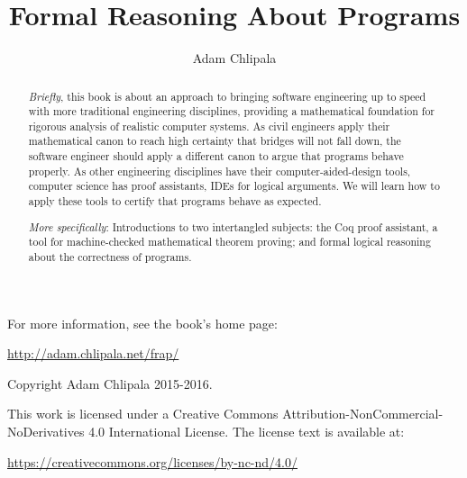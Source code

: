 \documentclass{amsbook}
\theoremstyle{definition}
\theoremstyle{remark}
\numberwithin{section}{chapter}
\numberwithin{equation}{chapter}
\begin{document}
\frontmatter

\title{Formal Reasoning About Programs}

\author{Adam Chlipala}
\address{MIT, Cambridge, MA, USA}

\begin{abstract}
  \emph{Briefly}, this book is about an approach to bringing software engineering up to speed with more traditional engineering disciplines, providing a mathematical foundation for rigorous analysis of realistic computer systems. As civil engineers apply their mathematical canon to reach high certainty that bridges will not fall down, the software engineer should apply a different canon to argue that programs behave properly. As other engineering disciplines have their computer-aided-design tools, computer science has proof assistants, IDEs for logical arguments. We will learn how to apply these tools to certify that programs behave as expected.

  \emph{More specifically}: Introductions to two intertangled subjects: the Coq proof assistant, a tool for machine-checked mathematical theorem proving; and formal logical reasoning about the correctness of programs.
\end{abstract}

\maketitle

\newpage

For more information, see the book's home page:

\begin{center} \url{http://adam.chlipala.net/frap/} \end{center}

\thispagestyle{empty}
\mbox{}\vfill
\begin{center}

Copyright Adam Chlipala 2015-2016.


This work is licensed under a
Creative Commons Attribution-NonCommercial-NoDerivatives 4.0 International License.
The license text is available at:

\end{center}

\begin{center} \url{https://creativecommons.org/licenses/by-nc-nd/4.0/} \end{center}

\newpage
\end{document}
